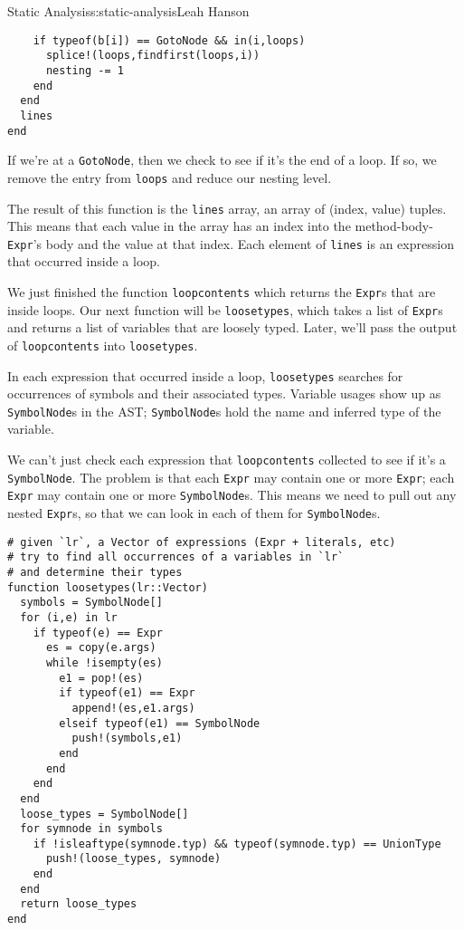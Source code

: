 \begin{aosachapter}{Static Analysis}{s:static-analysis}{Leah Hanson}
\begin{verbatim}
    if typeof(b[i]) == GotoNode && in(i,loops)
      splice!(loops,findfirst(loops,i))
      nesting -= 1
    end
  end
  lines
end
\end{verbatim}

If we're at a \texttt{GotoNode}, then we check to see if it's the end of
a loop. If so, we remove the entry from \texttt{loops} and reduce our
nesting level.

The result of this function is the \texttt{lines} array, an array of
(index, value) tuples. This means that each value in the array has an
index into the method-body-\texttt{Expr}'s body and the value at that
index. Each element of \texttt{lines} is an expression that occurred
inside a loop.

\label{finding-and-typing-variables}

We just finished the function \texttt{loopcontents} which returns the
\texttt{Expr}s that are inside loops. Our next function will be
\texttt{loosetypes}, which takes a list of \texttt{Expr}s and returns a
list of variables that are loosely typed. Later, we'll pass the output
of \texttt{loopcontents} into \texttt{loosetypes}.

In each expression that occurred inside a loop, \texttt{loosetypes}
searches for occurrences of symbols and their associated types. Variable
usages show up as \texttt{SymbolNode}s in the AST; \texttt{SymbolNode}s
hold the name and inferred type of the variable.

We can't just check each expression that \texttt{loopcontents} collected
to see if it's a \texttt{SymbolNode}. The problem is that each
\texttt{Expr} may contain one or more \texttt{Expr}; each \texttt{Expr}
may contain one or more \texttt{SymbolNode}s. This means we need to pull
out any nested \texttt{Expr}s, so that we can look in each of them for
\texttt{SymbolNode}s.

\begin{verbatim}
# given `lr`, a Vector of expressions (Expr + literals, etc)
# try to find all occurrences of a variables in `lr`
# and determine their types
function loosetypes(lr::Vector)
  symbols = SymbolNode[]
  for (i,e) in lr
    if typeof(e) == Expr
      es = copy(e.args)
      while !isempty(es)
        e1 = pop!(es)
        if typeof(e1) == Expr
          append!(es,e1.args)
        elseif typeof(e1) == SymbolNode
          push!(symbols,e1)
        end
      end
    end
  end
  loose_types = SymbolNode[]
  for symnode in symbols
    if !isleaftype(symnode.typ) && typeof(symnode.typ) == UnionType
      push!(loose_types, symnode)
    end
  end
  return loose_types
end
\end{verbatim}


\end{aosachapter}
